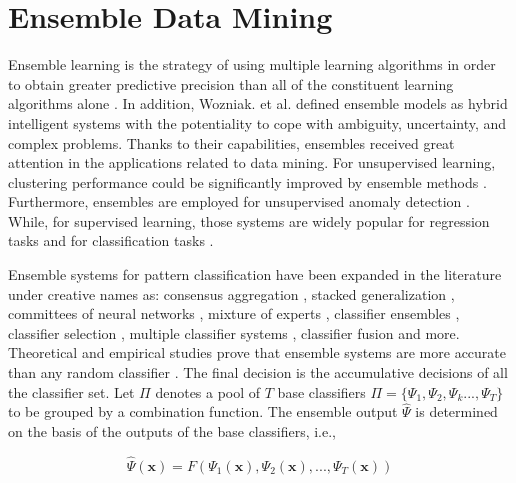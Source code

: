 %
%
\section{Ensemble Data Mining}
\label{sec:2_3_EDM}

Ensemble learning is the strategy of using multiple learning algorithms in order to obtain greater predictive precision than all of the constituent learning algorithms alone \cite{polikar2006,polikar2012,rokach2010,dietterich2002,zhang2012,opitz1999,sagi2018,oza2001,krawczyk2017}. In addition, Wozniak. et al. defined ensemble models as hybrid intelligent systems \cite{wozniak2014} with the potentiality to cope with ambiguity, uncertainty, and complex problems. Thanks to their capabilities, ensembles received great attention in the applications related to data mining. For unsupervised learning, clustering performance could be significantly improved by ensemble methods \cite{zhou2006,vega2011,cornuejols2018}. Furthermore, ensembles are employed for unsupervised anomaly detection \cite{zhao2015}. While, for supervised learning, those systems are widely popular for regression tasks \cite{mendes2012,ren2015} and for classification tasks \cite{wozniak2014,sagi2018}.


Ensemble systems for pattern classification have been expanded in the literature under creative names as: consensus aggregation \cite{benediktsson1992}, stacked generalization \cite{naimi2018}, committees of neural networks \cite{cirecsan2011}, mixture of experts \cite{jacobs1991,jordan1994}, classifier ensembles \cite{yu2014,rodriguez2006}, classifier selection \cite{ruta2005,cruz2018}, multiple classifier systems \cite{wozniak2014, catal2017}, classifier fusion \cite{liu2017cl} and more.  Theoretical and empirical studies prove that ensemble systems are more accurate than any random classifier \cite{catal2017, tahir2012,polikar2006,fernandez2014}. The final decision is the accumulative decisions of all the classifier set. Let $\Pi$ denotes a pool of $T$ base classifiers $\Pi=\{\Psi_1, \Psi_2,\Psi_k ..., \Psi_T\}$ to be grouped by a combination function. The ensemble output $\hat{\Psi}$ is determined on the basis of the outputs of the base classifiers, i.e.,

\begin{equation}
\label{eq-generalfusion}
\hat{\Psi}(\textbf{x})=F(\Psi_1(\textbf{x}), \Psi_2(\textbf{x}), ..., \Psi_T(\textbf{x}))
\end{equation}

